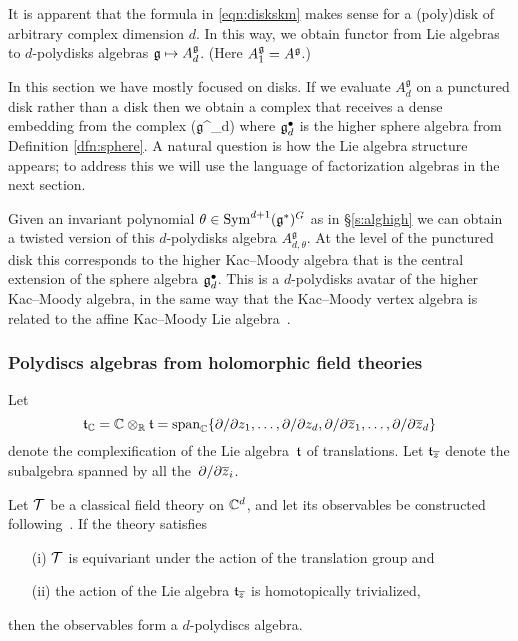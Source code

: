 \documentclass[11pt]{amsart}
\def\lie#1{\ensuremath{\mathfrak{#1}}}
\begin{document}
It is apparent that the formula in \eqref{eqn:diskskm} makes sense for a (poly)disk of arbitrary complex dimension $d$.
In this way, we obtain functor from Lie algebras to $d$-polydisks algebras $\mathfrak g \mapsto A^{\mathfrak g}_d$.
(Here $A^{\mathfrak g}_1 = A^{\mathfrak g}$.)

In this section we have mostly focused on disks.
If we evaluate $A^{\lie{g}}_{d}$ on a punctured disk rather than a disk then we obtain a complex that receives a dense embedding from the complex
\beqn
\Sym \left(\lie{g}^\bu_{d}\right) 
\eeqn
where $\lie{g}^\bu_d$ is the higher sphere algebra from Definition \ref{dfn:sphere}.
A natural question is how the Lie algebra structure appears; to address this we will use the language of factorization algebras in the next section.

Given an invariant polynomial $\theta \in \Sym^{d+1}(\lie{g}^*)^G$ as in \S \ref{s:alghigh} we can obtain a twisted version of this $d$-polydisks algebra $A^{\lie{g}}_{d,\theta}$.
At the level of the punctured disk this corresponds to the higher Kac--Moody algebra that is the central extension of the sphere algebra $\lie{\fg}^\bu_{d}$.
This is a $d$-polydisks avatar of the higher Kac--Moody algebra, in the same way that the Kac--Moody vertex algebra is related to the affine Kac--Moody Lie algebra~\cite{GWonKM}.

\subsubsection{Polydiscs algebras from holomorphic field theories}

Let 
\[
\mathfrak t_\mathbb C = \mathbb C \otimes_\mathbb R \mathfrak t = \text{span}_{\mathbb C}\{\partial/\partial z_1, \ldots, \partial/\partial z_d, \partial/\partial {\overline{z}}_1, \ldots, \partial/\partial {\overline{z}}_d  \}
\]
denote the complexification of the Lie algebra~$\mathfrak t$ of translations.
Let $\mathfrak t_{{\overline{z}}}$ denote the subalgebra spanned by all the~$\partial/\partial {\overline{z}}_i$.

\begin{thm}
Let $\mathcal T$ be a classical field theory on $\mathbb C^d$,
and let its observables be constructed following~\cite{CG2}.
If the theory satisfies 
\begin{enumerate}
\item[(i)] $\mathcal T$ is equivariant under the action of the translation group and
\item[(ii)] the action of the Lie algebra $\mathfrak t_{{\overline{z}}}$ is homotopically trivialized,
\end{enumerate}
then the observables form a $d$-polydiscs algebra.
\end{thm}
\end{document}
